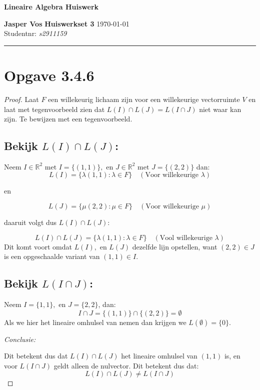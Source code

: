 \documentclass{article}
\newcommand{\R}{\mathbb{R}}
\newcommand{\en}{\text{ en }}
\newcommand{\met}{\text{ met }}
\begin{document}
{\Large \textbf{Lineaire Algebra Huiswerk}}

\bigskip

\textbf{Jasper Vos} \hfill \textbf{Huiswerkset 3} \hfill \today \\
Studentnr: \emph{s2911159}

\rule{\textwidth}{2pt}

\bigskip

\section*{Opgave 3.4.6}
\begin{proof}
    Laat $F$ een willekeurig lichaam zijn voor een willekeurige
    vectorruimte $V$ en laat met
    tegenvoorbeeld zien dat
    $L(I) \cap L(J) = L(I \cap J)$ niet waar kan zijn.
    Te bewijzen met een tegenvoorbeeld.

    \subsection*{Bekijk $L(I) \cap L(J)$:}
    Neem $I \in \R^2 \met I = \{(1,1)\}, \en J \in \R^2 \met J = \{(2,2)\}$ dan:
    \[L(I) =
        \{\lambda(1, 1) : \lambda \in F\} \quad (\text{Voor willekeurige $\lambda$})\]
    \begin{center}
        en
    \end{center}
    \[L(J) =
        \{\mu (2,2) : \mu \in F\} \quad (\text{Voor willekeurige $\mu$})\]
    \begin{center}
        daaruit volgt dus $L(I) \cap L(J)$:
    \end{center}
    \[ L(I) \cap L(J) = \{\lambda(1, 1) : \lambda \in F\} \quad (\text{Vool willekeurige $\lambda$})\]
    Dit komt voort omdat $L(I), \en L(J)$ dezelfde lijn opstellen,
    want $(2, 2)\in J$ is een opgeschaalde variant van $(1,1) \in I$.

    \subsection*{Bekijk $L(I \cap J)$:}
    Neem $I = \{1,1\}, \en J = \{2,2\}$, dan:
    \[ I \cap J = \{(1, 1)\} \cap \{(2, 2)\} = \emptyset\]
    Als we hier het lineaire omhulsel van nemen dan
    krijgen we $L(\emptyset) = \{0\}$.

    \bigskip

    \emph{Conclusie:}

    Dit betekent dus dat $L(I) \cap L(J)$ het lineaire omhulsel van $(1,1)$ is,
    en voor $L(I \cap J)$ geldt alleen de nulvector. Dit betekent dus dat:
    \[L(I) \cap L(J) \neq L(I \cap J)\]

\end{proof}
\newpage
\end{document}
